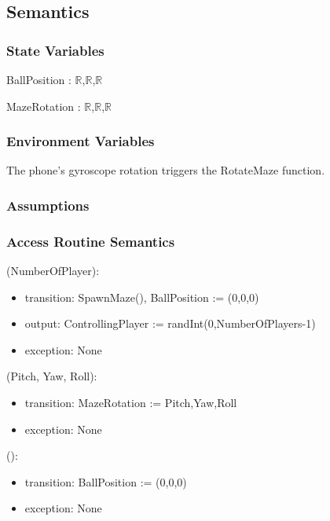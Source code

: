 \documentclass[12pt, titlepage]{article}
\begin{document}
\subsection{Semantics}

\subsubsection{State Variables}

BallPosition : {$\mathbb{R}$,$\mathbb{R}$,$\mathbb{R}$}

\noindent MazeRotation : {$\mathbb{R}$,$\mathbb{R}$,$\mathbb{R}$}

\subsubsection{Environment Variables}

The phone's gyroscope rotation triggers the RotateMaze function. 

\subsubsection{Assumptions}

\subsubsection{Access Routine Semantics}

(NumberOfPlayer):
\begin{itemize}
\item transition: SpawnMaze(), BallPosition := (0,0,0)
\item output: ControllingPlayer := randInt(0,NumberOfPlayers-1)
\item exception: None
\end{itemize}

(Pitch, Yaw, Roll):
\begin{itemize}
\item transition: MazeRotation := {Pitch,Yaw,Roll}
\item exception: None
\end{itemize}

():
\begin{itemize}
\item transition: BallPosition := (0,0,0)
\item exception: None 
\end{itemize}
\end{document}
